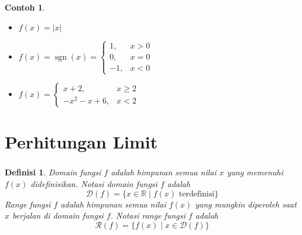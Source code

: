 \documentclass[aspectratio=169]{beamer}
\DeclareMathOperator{\sign}{sgn}
\newtheorem{definisi}{Definisi}
\theoremstyle{definition}
\newtheorem*{contoh}{Contoh}
\newcommand{\R}{\mathbb{R}}
\newcommand{\dom}{\mathcal{D}}
\newcommand{\rng}{\mathcal{R}}
\begin{document}
\begin{frame}
    \frametitle{\insertsection}
    \begin{contoh}
        \begin{itemize}
            \item $f(x)=|x|$
            \item $f(x)=\sign(x)=\begin{cases}
                          1,  & x>0 \\
                          0,  & x=0 \\
                          -1, & x<0
                      \end{cases}$
            \item $f(x)=\begin{cases}
                          x+2,      & x\geq 2 \\
                          -x^2-x+6, & x<2
                      \end{cases}$
        \end{itemize}
    \end{contoh}
\end{frame}

\section{Perhitungan Limit}
\begin{frame}
    \frametitle{\insertsection}
    \begin{definisi}
        Domain fungsi $f$ adalah himpunan semua nilai $x$ yang memenuhi $f(x)$ didefinisikan. Notasi domain fungsi $f$ adalah \[\dom(f)=\{x\in\R\mid f(x)\text{ terdefinisi}\}\]
        Range fungsi $f$ adalah himpunan semua nilai $f(x)$ yang mungkin diperoleh saat $x$ berjalan di domain fungsi $f$. Notasi range fungsi $f$ adalah \[\rng(f)=\{f(x)\mid x\in\dom(f)\}\]
    \end{definisi}
\end{frame}
\end{document}
